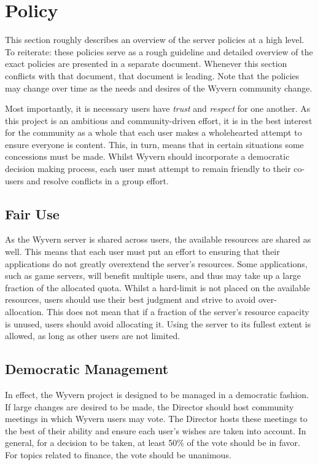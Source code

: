 \section{Policy}
\label{sec:policy}
This section roughly describes an overview of the server policies at a high level. To reiterate: these policies serve as a rough guideline and detailed overview of the exact policies are presented in a separate document. Whenever this section conflicts with that document, that document is leading. Note that the policies may change over time as the needs and desires of the Wyvern community change.

Most importantly, it is necessary users have \textit{trust} and \textit{respect} for one another. As this project is an ambitious and community-driven effort, it is in the best interest for the community as a whole that each user makes a wholehearted attempt to ensure everyone is content. This, in turn, means that in certain situations some concessions must be made. Whilst Wyvern should incorporate a democratic decision making process, each user must attempt to remain friendly to their co-users and resolve conflicts in a group effort.

\subsection{Fair Use}
As the Wyvern server is shared across users, the available resources are shared as well. This means that each user must put an effort to ensuring that their applications do not greatly overextend the server's resources. Some applications, such as game servers, will benefit multiple users, and thus may take up a large fraction of the allocated quota. Whilst a hard-limit is not placed on the available resources, users should use their best judgment and strive to avoid over-allocation. This does not mean that if a fraction of the server's resource capacity is unused, users should avoid allocating it. Using the server to its fullest extent is allowed, as long as other users are not limited.

\subsection{Democratic Management}
In effect, the Wyvern project is designed to be managed in a democratic fashion. If large changes are desired to be made, the Director should host community meetings in which Wyvern users may vote. The Director hosts these meetings to the best of their ability and ensure each user's wishes are taken into account. In general, for a decision to be taken, at least 50\% of the vote should be in favor. For topics related to finance, the vote should be unanimous.

